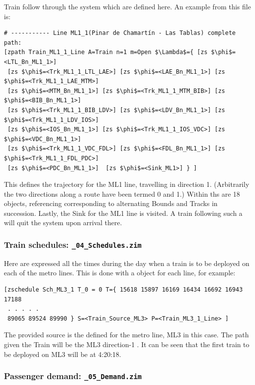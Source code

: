 Train  follow  through the system which are defined here.
An example  from this file is:
\begin{lstlisting}[mathescape]
# ----------- Line ML1_1(Pinar de Chamartín - Las Tablas) complete path:
[zpath Train_ML1_1_Line A=Train n=1 m=Open $\Lambda$={ [zs $\phi$=<LTL_Bn_ML1_1>]
 [zs $\phi$=<Trk_ML1_1_LTL_LAE>] [zs $\phi$=<LAE_Bn_ML1_1>] [zs $\phi$=<Trk_ML1_1_LAE_MTM>]
 [zs $\phi$=<MTM_Bn_ML1_1>] [zs $\phi$=<Trk_ML1_1_MTM_BIB>] [zs $\phi$=<BIB_Bn_ML1_1>]
 [zs $\phi$=<Trk_ML1_1_BIB_LDV>] [zs $\phi$=<LDV_Bn_ML1_1>] [zs $\phi$=<Trk_ML1_1_LDV_IOS>]
 [zs $\phi$=<IOS_Bn_ML1_1>] [zs $\phi$=<Trk_ML1_1_IOS_VDC>] [zs $\phi$=<VDC_Bn_ML1_1>]
 [zs $\phi$=<Trk_ML1_1_VDC_FDL>] [zs $\phi$=<FDL_Bn_ML1_1>] [zs $\phi$=<Trk_ML1_1_FDL_PDC>]
 [zs $\phi$=<PDC_Bn_ML1_1>]  [zs $\phi$=<Sink_ML1>] } ]
\end{lstlisting}
This defines the trajectory for the ML1 line, travelling in direction
1. (Arbitrarily the two directions along a route have been termed 0
and 1.) Within ths  are 18  objects,
referencing  corresponding to alternating Bounds and Tracks in
succession. Lastly, the Sink for the ML1 line is visited. A train
following such a  will quit the system upon arrival there.

\subsubsection{Train schedules: {\tt \_04\_Schedules.zim}}

Here are expressed all the times during the day when a train is to be deployed
on each of the metro lines. This is done with a  object
for each line, for example:
\begin{lstlisting}[mathescape]
[zschedule Sch_ML3_1 T_0 = 0 T={ 15618 15897 16169 16434 16692 16943 17188
 . . . . . 
 89065 89524 89990 } S=<Train_Source_ML3> P=<Train_ML3_1_Line> ]
\end{lstlisting}
The provided source is the  defined for the metro line, ML3 in this case.
The path given the Train will be the ML3 direction-1 .
It can be seen that the first train to be deployed on ML3 will be at 4:20:18.

\subsubsection{Passenger demand: {\tt \_05\_Demand.zim}}

